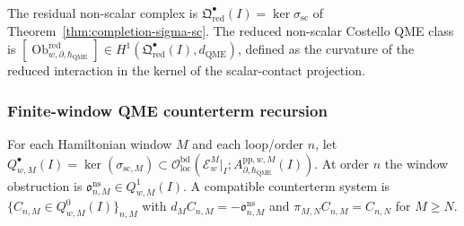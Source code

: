 \begin{defn}
\label{def:completion-residual-nonscalar}
The residual non-scalar complex is
\(\mathfrak Q^\bullet_{\mathrm{red}}(I)=\ker\sigma_{\mathrm{sc}}\)
of Theorem~\ref{thm:completion-sigma-sc}.  The reduced non-scalar
Costello QME class is
\([\operatorname{Ob}^{\mathrm{red}}_{w,\partial,\hbar_{\mathrm{QME}}}]\in
H^1(\mathfrak Q^\bullet_{\mathrm{red}}(I),d_{\mathrm{QME}})\),
defined as the curvature of the reduced interaction in the kernel
of the scalar-contact projection.
\end{defn}

\subsubsection{Finite-window QME counterterm recursion}
\label{sssec:completion-qme-tower-recursion}

\begin{defn}
\label{def:completion-finite-window-residual}
For each Hamiltonian window \(M\) and each loop/order \(n\), let
\(Q^\bullet_{w,M}(I)=\ker(\sigma_{\mathrm{sc},M})\subset
\mathcal O^{\mathrm{bd}}_{\mathrm{loc}}(\mathcal E^M_w|_I;
A^{\mathrm{pp},w,M}_{\partial,\hbar_{\mathrm{QME}}}(I))\).  At order \(n\) the
window obstruction is \(\mathfrak o^{\mathrm{ns}}_{n,M}\in
Q^1_{w,M}(I)\).  A compatible counterterm system is
\(\{C_{n,M}\in Q^0_{w,M}(I)\}_{n,M}\) with
\(d_M C_{n,M}=-\mathfrak o^{\mathrm{ns}}_{n,M}\) and
\(\pi_{M,N}C_{n,M}=C_{n,N}\) for \(M\ge N\).
\end{defn}


